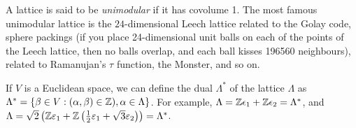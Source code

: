 A lattice is said to be {\em unimodular} if it has covolume 1. The most famous
unimodular lattice is the $24$-dimensional Leech lattice related to the Golay
code, sphere packings (if you place 24-dimensional unit balls on each of the
points of the Leech lattice, then no balls overlap, and each ball kisses
196560 neighbours), related to Ramanujan's $\tau$ function, the Monster, and
so on.

If $V$ is a Euclidean space, we can define the dual $\Lambda^*$ of the lattice
$\Lambda$ as $\Lambda^* = \{\beta \in V : (\alpha, \beta) \in \mathbb{Z}),
\alpha \in \Lambda\}$.
For example, $\Lambda = \mathbb{Z}\epsilon_1 + \mathbb{Z}\epsilon_2 = \Lambda^*$, and
$\Lambda = \sqrt{2} \left( \mathbb{Z} \varepsilon_1 + \mathbb{Z} \left(
\frac{1}{2} \varepsilon_1 + \sqrt{3} \varepsilon_2\right) \right) = \Lambda^*$.
